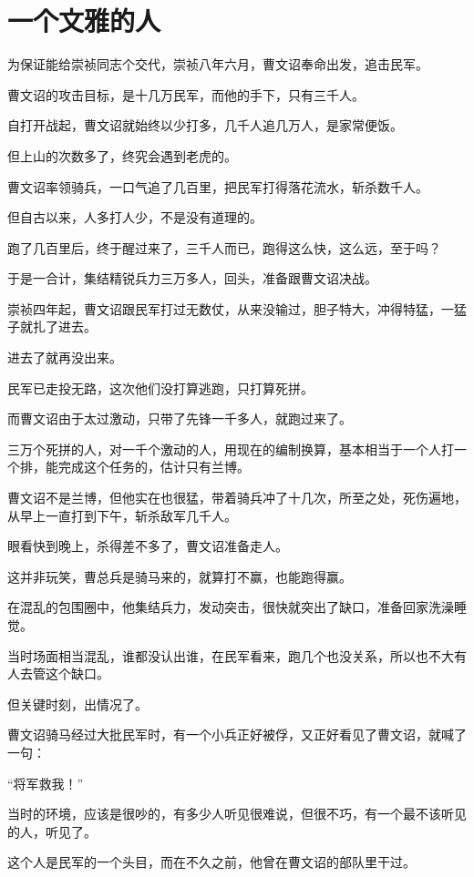 \section{一个文雅的人}
\ifnum{}
	\begin{multicols}{\theparacolNo}
\fi
为保证能给崇祯同志个交代，崇祯八年六月，曹文诏奉命出发，追击民军。

曹文诏的攻击目标，是十几万民军，而他的手下，只有三千人。

自打开战起，曹文诏就始终以少打多，几千人追几万人，是家常便饭。

但上山的次数多了，终究会遇到老虎的。

曹文诏率领骑兵，一口气追了几百里，把民军打得落花流水，斩杀数千人。

但自古以来，人多打人少，不是没有道理的。

跑了几百里后，终于醒过来了，三千人而已，跑得这么快，这么远，至于吗？

于是一合计，集结精锐兵力三万多人，回头，准备跟曹文诏决战。

崇祯四年起，曹文诏跟民军打过无数仗，从来没输过，胆子特大，冲得特猛，一猛子就扎了进去。

进去了就再没出来。

民军已走投无路，这次他们没打算逃跑，只打算死拼。

而曹文诏由于太过激动，只带了先锋一千多人，就跑过来了。

三万个死拼的人，对一千个激动的人，用现在的编制换算，基本相当于一个人打一个排，能完成这个任务的，估计只有兰博。

曹文诏不是兰博，但他实在也很猛，带着骑兵冲了十几次，所至之处，死伤遍地，从早上一直打到下午，斩杀敌军几千人。

眼看快到晚上，杀得差不多了，曹文诏准备走人。

这并非玩笑，曹总兵是骑马来的，就算打不赢，也能跑得赢。

在混乱的包围圈中，他集结兵力，发动突击，很快就突出了缺口，准备回家洗澡睡觉。

当时场面相当混乱，谁都没认出谁，在民军看来，跑几个也没关系，所以也不大有人去管这个缺口。

但关键时刻，出情况了。

曹文诏骑马经过大批民军时，有一个小兵正好被俘，又正好看见了曹文诏，就喊了一句：

“将军救我！”

当时的环境，应该是很吵的，有多少人听见很难说，但很不巧，有一个最不该听见的人，听见了。

这个人是民军的一个头目，而在不久之前，他曾在曹文诏的部队里干过。


\end{multicols}
